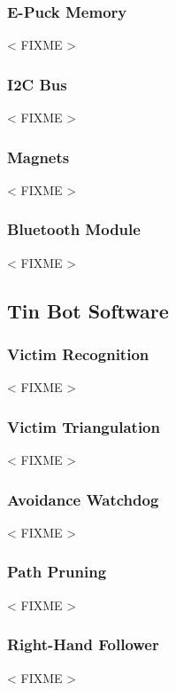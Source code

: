 \documentclass[a4paper,parskip,headheight=38pt]{scrartcl} %
\newcommand{\incomplete}[1]{\textless{} #1 \textgreater{}}
\begin{document}
\subsubsection{E-Puck Memory}
\incomplete{FIXME}

\subsubsection{I2C Bus}
\incomplete{FIXME}

\subsubsection{Magnets}
\incomplete{FIXME}

\subsubsection{Bluetooth Module}
\incomplete{FIXME}

\subsection{Tin Bot Software} %

\subsubsection{Victim Recognition}
\incomplete{FIXME}

\subsubsection{Victim Triangulation}
\incomplete{FIXME}

\subsubsection{Avoidance Watchdog}
\incomplete{FIXME}

\subsubsection{Path Pruning}
\incomplete{FIXME}


\subsubsection{Right-Hand Follower} %
\incomplete{FIXME}
\end{document}
